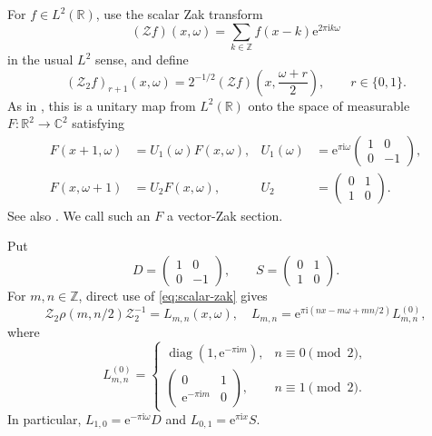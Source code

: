 \documentclass[10pt,a4paper]{amsart}
\numberwithin{equation}{section}
\newcommand{\R}{\mathbb R}
\newcommand{\C}{\mathbb C}
\newcommand{\Z}{\mathbb Z}
\newcommand{\cZ}{\mathcal Z}
\newcommand{\cZtwo}{\mathcal Z_2}
\newcommand{\e}{\mathrm e}
\newcommand{\ii}{\mathrm i}
\begin{document}
For $f\in L^2(\R)$, use the scalar Zak transform
\begin{equation}\label{eq:scalar-zak}
 (\cZ f)(x,\omega)=\sum_{k\in\Z}f(x-k)\e^{2\pi\ii k\omega}
\end{equation}
in the usual $L^2$ sense, and define
\begin{equation}\label{eq:vector-zak}
 (\cZtwo f)_{r+1}(x,\omega)
 =2^{-1/2}(\cZ f)\left(x,\frac{\omega+r}{2}\right),
 \qquad r\in\{0,1\}.
\end{equation}
As in \cite[\S3]{FPPV2026}, this is a unitary map from $L^2(\R)$ onto the
space of measurable $F:\R^2\to\C^2$ satisfying
\begin{align}
 F(x+1,\omega)&=U_1(\omega)F(x,\omega),
 &U_1(\omega)&=\e^{\pi\ii\omega}
                   \begin{pmatrix}1&0\\0&-1\end{pmatrix},
 \label{eq:sewing-x}\\
 F(x,\omega+1)&=U_2F(x,\omega),
 &U_2&=\begin{pmatrix}0&1\\1&0\end{pmatrix}.
 \label{eq:sewing-w}
\end{align}
See also \cite{ZibZee97}.  We call such an $F$ a vector-Zak section.

Put
\[
 D=\begin{pmatrix}1&0\\0&-1\end{pmatrix},\qquad
 S=\begin{pmatrix}0&1\\1&0\end{pmatrix}.
\]
For $m,n\in\Z$, direct use of \eqref{eq:scalar-zak} gives
\begin{equation}\label{eq:half-lattice-action}
 \cZtwo\rho(m,n/2)\cZtwo^{-1}
 =L_{m,n}(x,\omega),\quad
 L_{m,n}=\e^{\pi\ii(nx-m\omega+mn/2)}L_{m,n}^{(0)},
\end{equation}
where
\[
 L_{m,n}^{(0)}=
 \begin{cases}
  \operatorname{diag}(1,\e^{-\pi\ii m}),&n\equiv0\pmod2,\\[1mm]
  \begin{pmatrix}0&1\\ \e^{-\pi\ii m}&0\end{pmatrix},
      &n\equiv1\pmod2.
 \end{cases}
\]
In particular, $L_{1,0}=\e^{-\pi\ii\omega}D$ and
$L_{0,1}=\e^{\pi\ii x}S$.
\end{document}
